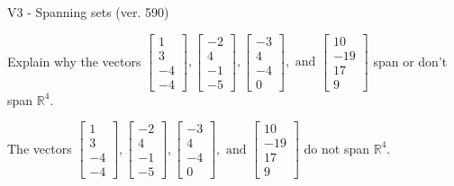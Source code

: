 \begin{exercise}
  \begin{exerciseTitle}V3 - Spanning sets (ver. 590)\end{exerciseTitle}
  \begin{exerciseStatement}
    Explain why the vectors \(\left[\begin{array}{r}
1 \\
3 \\
-4 \\
-4
\end{array}\right] , \left[\begin{array}{r}
-2 \\
4 \\
-1 \\
-5
\end{array}\right] , \left[\begin{array}{r}
-3 \\
4 \\
-4 \\
0
\end{array}\right] , \text{ and } \left[\begin{array}{r}
10 \\
-19 \\
17 \\
9
\end{array}\right]\) span or don't span \(\mathbb{R}^4\). 
	


  \end{exerciseStatement}
  \begin{exerciseAnswer}
   The vectors \(\left[\begin{array}{r}
1 \\
3 \\
-4 \\
-4
\end{array}\right] , \left[\begin{array}{r}
-2 \\
4 \\
-1 \\
-5
\end{array}\right] , \left[\begin{array}{r}
-3 \\
4 \\
-4 \\
0
\end{array}\right] , \text{ and } \left[\begin{array}{r}
10 \\
-19 \\
17 \\
9
\end{array}\right]\) 
  	 do not  
	span \(\mathbb{R}^4\).
  


  \end{exerciseAnswer}
\end{exercise}